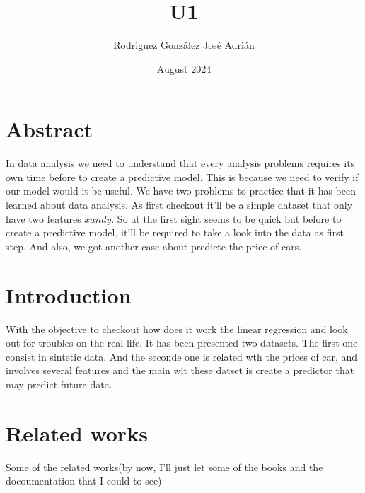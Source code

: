 \documentclass{article}
\title{U1}
\author{Rodriguez González José Adrián }
\date{August 2024}
\begin{document}
\maketitle

\section{Abstract}
In data analysis we need to understand that every analysis problems requires its own time before to create a predictive model. This is because we need to verify if our model would it be useful.
We have two problems to practice that it has been learned about data analysis. As first checkout it'll be a simple dataset that only have two features \(x and y\). So at the first sight seems to be quick but before to create a predictive model, it'll be required to take a look into the data as first step. And also, we got another case about predicte the price of cars.
\section{Introduction}
With the objective to checkout how does it work the linear regression and look out for troubles on the real life. It has been presented two datasets. The first one consist in sintetic data.
And the seconde one is related wth the prices of car, and involves several features and the main wit these datset is create a predictor that may predict future data.
\section{Related works}
Some of the related works(by now, I'll just let some of the books and the docoumentation that I could  to see)
\end{document}
